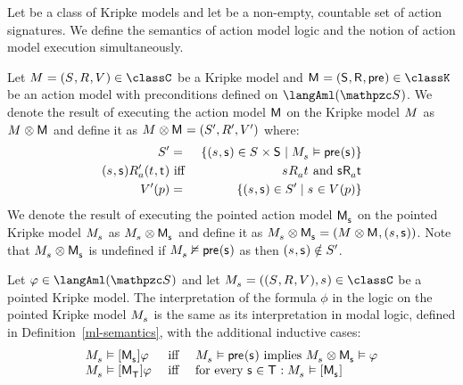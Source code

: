 \begin{definition}
Let \classC{} be a class of Kripke models and let \aSignatureFamily{} be a non-empty, countable set of action signatures.
We define the semantics of action model logic and the notion of action model execution simultaneously.

Let $\kModelAndTuple \in \classC$ be a Kripke model and $\aModelAndTuple \in \classK$ be an action model with preconditions defined on $\langAml(\aSignatureFamily)$.
We denote the result of executing the action model $\aModel$ on the Kripke model $\kModel$ as $\kModel \exec \aModel$ and define it as $\kModel \exec \aModel = \kModelTupleP$ where:
\begin{eqnarray*}
    \kStatesP &=& \{(\kStateS, \aStateS) \in \kStates \times \aStates \mid \kPModel{\kStateS} \entails \aPrecondition(\aStateS)\}\\
    (\kStateS, \aStateS) \kAccessibilityPA (\kStateT, \aStateT) &\text{ iff }& \kStateS \kAccessibilityA \kStateT \text{ and } \aStateS \aAccessibilityA \aStateT\\
    \kValuationP(\atomP) &=& \{(\kStateS, \aStateS) \in \kStatesP \mid \kStateS \in \kValuation(\atomP)\}
\end{eqnarray*}
We denote the result of executing the pointed action model $\aPModel{\aStateS}$ on the pointed Kripke model $\kPModel{\kStateS}$ as $\kPModel{\kStateS} \exec \aPModel{\aStateS}$ and define it as $\kPModel{\kStateS} \exec \aPModel{\aStateS} = (\kModel \exec \aModel, (\kStateS, \aStateS))$. Note that $\kPModel{\kStateS} \exec \aPModel{\aStateS}$ is undefined if $\kPModel{\kStateS} \nentails \aPrecondition(\aStateS)$ as then $(\kStateS, \aStateS) \notin \kStatesP$.

Let $\phi \in \langAml(\aSignatureFamily)$ and let $\kPModelAndTuple{\kStateS} \in \classC$ be a pointed Kripke model.
The interpretation of the formula $\phi$ in the logic \logicAmlC{} on the pointed Kripke model $\kPModel{\kStateS}$ is the same as its interpretation in modal logic, defined in Definition~\ref{ml-semantics}, with the additional inductive cases:
$$
\begin{array}{lcl}
    \kPModel{\kStateS} \entails \actionA{\aPModel{\aStateS}} \phi & \text { iff } & \kPModel{\kStateS} \entails \aPrecondition(\aStateS) \text{ implies } \kPModel{\kStateS} \exec \aPModel{\aStateS} \entails \phi\\
    \kPModel{\kStateS} \entails \actionA{\aPModel{\aStatesT}} \phi & \text { iff } & \text{for every } \aStateS \in \aStatesT: \kPModel{\kStateS} \entails \actionA{\aPModel{\aStateS}}
\end{array}
$$
\end{definition}

